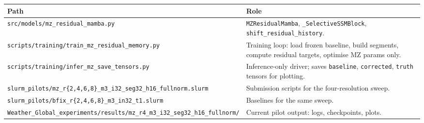 \documentclass[11pt,a4paper]{article}
\begin{document}
\begin{table}[H]
\centering
\small
\begin{tabular}{p{6.6cm}p{8.4cm}}
\toprule
Path & Role \\
\midrule
\texttt{src/models/mz\_residual\_mamba.py} & \texttt{MZResidualMamba}, \texttt{\_SelectiveSSMBlock}, \texttt{shift\_residual\_history}. \\
\texttt{scripts/training/train\_mz\_residual\_memory.py} & Training loop: load frozen baseline, build segments, compute residual targets, optimise MZ params only. \\
\texttt{scripts/training/infer\_mz\_save\_tensors.py} & Inference-only driver; saves \texttt{baseline}, \texttt{corrected}, \texttt{truth} tensors for plotting. \\
\texttt{slurm\_pilots/mz\_r\{2,4,6,8\}\_m3\_i32\_seg32\_h16\_fullnorm.slurm} & Submission scripts for the four-resolution sweep. \\
\texttt{slurm\_pilots/bfix\_r\{2,4,6,8\}\_m3\_in32\_t1.slurm} & Baselines for the same sweep. \\
\texttt{Weather\_Global\_experiments/results/mz\_r4\_m3\_i32\_seg32\_h16\_fullnorm/} & Current pilot output: logs, checkpoints, plots. \\
\bottomrule
\end{tabular}
\end{table}
\end{document}
